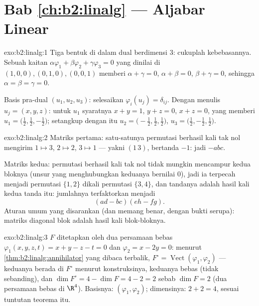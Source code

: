 \section*{Bab \ref{ch:b2:linalg} --- Aljabar Linear}

\begin{solution}{exo:b2:linalg:1}
Tiga bentuk di dalam dual berdimensi $3$: cukuplah kebebasannya. Sebuah
kaitan $\alpha\varphi_1 + \beta\varphi_2 + \gamma\varphi_3 = 0$ yang
dinilai di $(1,0,0), (0,1,0), (0,0,1)$ memberi $\alpha + \gamma = 0$,
$\alpha + \beta = 0$, $\beta + \gamma = 0$, sehingga $\alpha = \beta =
\gamma = 0$.

Basis pra-dual $(u_1, u_2, u_3)$: selesaikan $\varphi_i(u_j) =
\delta_{ij}$. Dengan menulis $u_j = (x, y, z)$: untuk $u_1$ syaratnya
$x + y = 1$, $y + z = 0$, $x + z = 0$, yang memberi $u_1 =
\bigl(\tfrac12, \tfrac12, -\tfrac12\bigr)$; setangkup dengan itu $u_2 =
\bigl(-\tfrac12, \tfrac12, \tfrac12\bigr)$, $u_3 = \bigl(\tfrac12,
-\tfrac12, \tfrac12\bigr)$.
\end{solution}

\begin{solution}{exo:b2:linalg:2}
Matriks pertama: satu-satunya permutasi berhasil kali tak nol mengirim
$1 \mapsto 3$, $2 \mapsto 2$, $3 \mapsto 1$ --- yakni 
$(1\,3)$, bertanda $-1$: jadi  $-abc$.

Matriks kedua: permutasi berhasil kali tak nol tidak mungkin mencampur
kedua bloknya (unsur yang menghubungkan keduanya bernilai $0$), jadi ia
terpecah menjadi permutasi $\{1,2\}$ dikali permutasi $\{3,4\}$, dan
tandanya adalah hasil kali kedua tanda itu: jumlahnya terfaktorkan menjadi
\[
(ad - bc)(eh - fg) .
\]
Aturan umum yang disarankan (dan memang benar, dengan bukti serupa):
 matriks diagonal blok adalah hasil kali 
blok-bloknya.
\end{solution}

\begin{solution}{exo:b2:linalg:3}
$F$ ditetapkan oleh dua persamaan bebas $\varphi_1(x,y,z,t)
= x + y - z - t = 0$ dan $\varphi_2 = x - 2y = 0$: menurut
\cref{thm:b2:linalg:annihilator} yang dibaca terbalik, $F^\circ =
\operatorname{Vect}(\varphi_1, \varphi_2)$ --- keduanya berada di $F^\circ$
menurut konstruksinya, keduanya bebas (tidak sebanding), dan $\dim F^\circ
= 4 - \dim F = 4 - 2 = 2$ sebab $\dim F = 2$ (dua persamaan bebas
di $\R^4$). Basisnya: $(\varphi_1, \varphi_2)$; dimensinya:
$2 + 2 = 4$, sesuai tuntutan teorema itu.
\end{solution}

